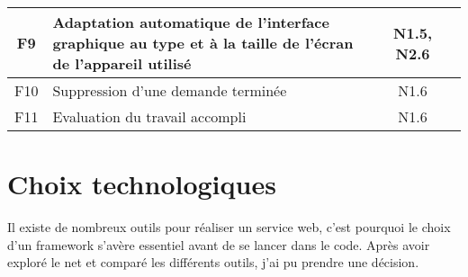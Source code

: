 \documentclass[
    iai, %
    eai, %
]{heig-tb}
\begin{document}
\begin{table}[h]
\begin{center}
\begin{tabularx}{\textwidth}{cXcc}
      F9  & Adaptation automatique de l’interface graphique au type et à la taille de l’écran de l’appareil utilisé                                                                                    & N1.5, N2.6 \\ \midrule
      F10 & Suppression d’une demande terminée                                                                                                                                                         & N1.6       \\ \midrule
      F11 & Evaluation du travail accompli                                                                                                                                                             & N1.6       \\ \midrule
    \end{tabularx}
  \end{center}
\end{table}

\section{Choix technologiques}

Il existe de nombreux outils pour réaliser un service web, c'est pourquoi le choix d'un framework s'avère essentiel avant de se lancer dans le code.
Après avoir exploré le net et comparé les différents outils, j'ai pu prendre une décision.
\end{document}
